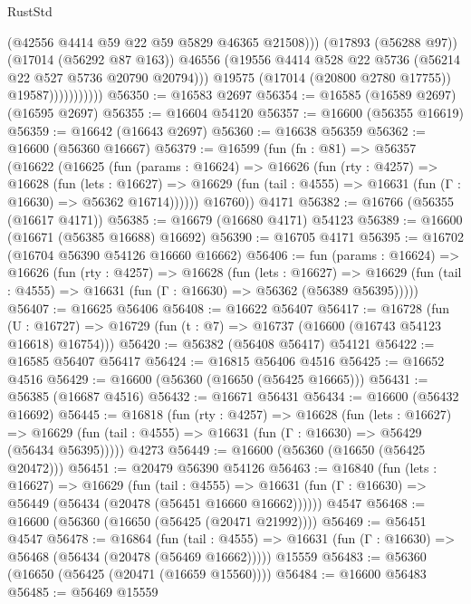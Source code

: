\begin{lexlean}{RustStd}
\begin{coremodule}
                                (@42556 @4414 @59 @22 @59 @5829 @46365 @21508)))
                            (@17893 (@56288 @97))
                            (@17014 (@56292 @87 @163))
                            @46556
                            (@19556 @4414 @528 @22 @5736 (@56214 @22 @527 @5736 @20790 @20794)))
                          @19575
                          (@17014 (@20800 @2780 @17755))
                          @19587)))))))))))
@56350 := @16583 @2697
@56354 := @16585 (@16589 @2697) (@16595 @2697)
@56355 := @16604 @54120
@56357 := @16600 (@56355 @16619)
@56359 := @16642 (@16643 @2697)
@56360 := @16638 @56359
@56362 := @16600 (@56360 @16667)
@56379 := @16599
    (fun (fn : @81) =>
    @56357
      (@16622
        (@16625
          (fun (params : @16624) =>
          @16626
            (fun (rty : @4257) =>
            @16628
              (fun (lets : @16627) =>
              @16629 (fun (tail : @4555) => @16631 (fun (Γ : @16630) => @56362 @16714))))))
        @16760))
    @4171
@56382 := @16766 (@56355 (@16617 @4171))
@56385 := @16679 (@16680 @4171) @54123
@56389 := @16600 (@16671 (@56385 @16688) @16692)
@56390 := @16705 @4171
@56395 := @16702 (@16704 @56390 @54126 @16660 @16662)
@56406 := fun (params : @16624) =>
  @16626
    (fun (rty : @4257) =>
    @16628
      (fun (lets : @16627) =>
      @16629 (fun (tail : @4555) => @16631 (fun (Γ : @16630) => @56362 (@56389 @56395)))))
@56407 := @16625 @56406
@56408 := @16622 @56407
@56417 := @16728
    (fun (U : @16727) => @16729 (fun (t : @7) => @16737 (@16600 (@16743 @54123 @16618) @16754)))
@56420 := @56382 (@56408 @56417) @54121
@56422 := @16585 @56407 @56417
@56424 := @16815 @56406 @4516
@56425 := @16652 @4516
@56429 := @16600 (@56360 (@16650 (@56425 @16665)))
@56431 := @56385 (@16687 @4516)
@56432 := @16671 @56431
@56434 := @16600 (@56432 @16692)
@56445 := @16818
    (fun (rty : @4257) =>
    @16628
      (fun (lets : @16627) =>
      @16629 (fun (tail : @4555) => @16631 (fun (Γ : @16630) => @56429 (@56434 @56395)))))
    @4273
@56449 := @16600 (@56360 (@16650 (@56425 @20472)))
@56451 := @20479 @56390 @54126
@56463 := @16840
    (fun (lets : @16627) =>
    @16629
      (fun (tail : @4555) =>
      @16631 (fun (Γ : @16630) => @56449 (@56434 (@20478 (@56451 @16660 @16662))))))
    @4547
@56468 := @16600 (@56360 (@16650 (@56425 (@20471 @21992))))
@56469 := @56451 @4547
@56478 := @16864
    (fun (tail : @4555) => @16631 (fun (Γ : @16630) => @56468 (@56434 (@20478 (@56469 @16662)))))
    @15559
@56483 := @56360 (@16650 (@56425 (@20471 (@16659 @15560))))
@56484 := @16600 @56483
@56485 := @56469 @15559

\end{coremodule}
\end{lexlean}
